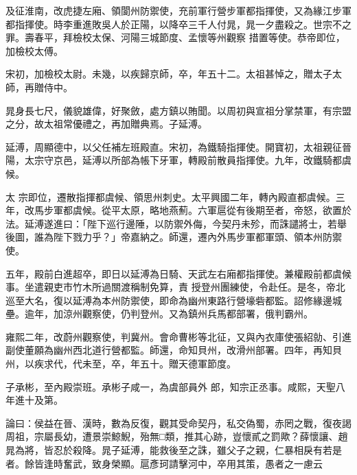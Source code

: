 \begin{pinyinscope}
 及征淮南，改虎捷左廂、領閬州防禦使，充前軍行營步軍都指揮使，又為緣江步軍都指揮使。時李重進敗吳人於正陽，以降卒三千人付晁，晁一夕盡殺之。世宗不之罪。壽春平，拜檢校太保、河陽三城節度、孟懷等州觀察
 措置等使。恭帝即位，加檢校太傅。



 宋初，加檢校太尉。未幾，以疾歸京師，卒，年五十二。太祖甚悼之，贈太子太師，再贈侍中。



 晁身長七尺，儀貌雄偉，好聚斂，處方鎮以賄聞。以周初與宣祖分掌禁軍，有宗盟之分，故太祖常優禮之，再加贈典焉。子延溥。



 延溥，周顯德中，以父任補左班殿直。宋初，為鐵騎指揮使。開寶初，太祖親征晉陽，太宗守京邑，延溥以所部為帳下牙軍，轉殿前散員指揮使。九年，改鐵騎都虞候。



 太
 宗即位，遷散指揮都虞候、領思州刺史。太平興國二年，轉內殿直都虞候。三年，改馬步軍都虞候。從平太原，略地燕薊。六軍扈從有後期至者，帝怒，欲置於法。延溥遂進曰：「陛下巡行邊陲，以防禦外侮，今契丹未殄，而誅譴將士，若舉後圖，誰為陛下戮力乎？」帝嘉納之。師還，遷內外馬步軍都軍頭、領本州防禦使。



 五年，殿前白進超卒，即日以延溥為日騎、天武左右廂都指揮使。兼權殿前都虞候事。坐遣親吏市竹木所過關渡稱制免算，責
 授登州團練使，令赴任。是冬，帝北巡至大名，復以延溥為本州防禦使，即命為幽州東路行營壕砦都監。詔修緣邊城壘。逾年，加涼州觀察使，仍判登州。又為鎮州兵馬都部署，俄判霸州。



 雍熙二年，改蔚州觀察使，判冀州。會命曹彬等北征，又與內衣庫使張紹勍、引進副使董願為幽州西北道行營都監。師還，命知貝州，改滑州部署。四年，再知貝州，以疾求代，代未至，卒，年五十。贈天德軍節度。



 子承彬，至內殿崇班。承彬子咸一，為虞部員外
 郎，知宗正丞事。咸熙，天聖八年進十及第。



 論曰：侯益在晉、漢時，數為反復，觀其受命契丹，私交偽蜀，赤罔之戰，復夜謁周祖，宗屬長幼，遭景崇鯨鯢，殆無□類，推其心跡，豈懷貳之罰歟？薛懷讓、趙晁為將，皆忍於殺降。晁子延溥，能救後至之誅，雖父子之親，仁暴相戾有若是者。餘皆逢時奮武，致身榮顯。扈彥珂請擊河中，卒用其策，愚者之一慮云



\end{pinyinscope}